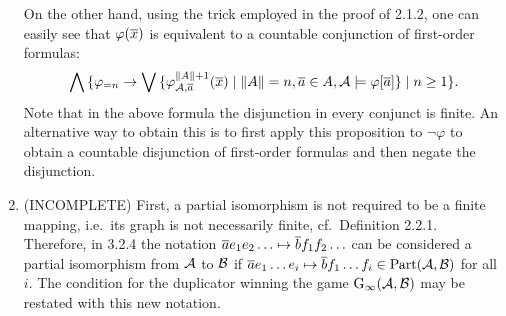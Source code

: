 \begin{enumerate}[1.]
On the other hand, using the trick employed in the proof of 2.1.2, one can easily see that $\varphi(\overline{x})$ is equivalent to a countable conjunction of first-order formulas:
\[
\bigwedge {\{\varphi_{= n} \rightarrow\bigvee{\{\varphi^{\|A\| + 1}_{\mathcal{A}, \overline{a}}(\overline{x}) \mid \|A\| = n, \overline{a} \in A, \mathcal{A} \models\varphi[\overline{a}]\}} \mid n \geq 1\}}.
\]
Note that in the above formula the disjunction in every conjunct is finite. An alternative way to obtain this is to first apply this proposition to $\neg\varphi$ to obtain a countable disjunction of first-order formulas and then negate the disjunction.
%
\item {} (INCOMPLETE) First, a partial isomorphism is not required to be a finite mapping, i.e.\ its graph is not necessarily finite, cf.\ Definition 2.2.1. Therefore, in 3.2.4 the notation $\overline{a}e_1e_2\ldots \mapsto \overline{b}f_1f_2\ldots$ can be considered a partial isomorphism from $\mathcal{A}$ to $\mathcal{B}$ if $\overline{a}e_1\ldots e_i \mapsto \overline{b}f_1\ldots f_i \in \mathrm{Part}(\mathcal{A}, \mathcal{B})$ for all $i$. The condition for the duplicator winning the game $\game{\infty}(\strct{A}, \strct{B})$ may be restated with this new notation.


\end{enumerate}
